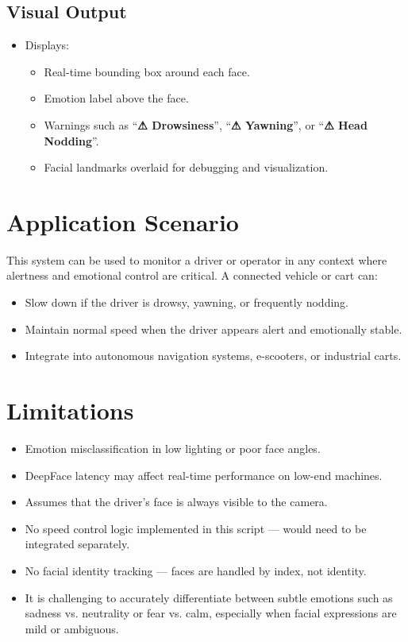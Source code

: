 \documentclass[12pt]{article}
\begin{document}
\subsection{Visual Output}
\begin{itemize}
    \item Displays:
    \begin{itemize}
        \item Real-time bounding box around each face.
        \item Emotion label above the face.
        \item Warnings such as ``\textbf{⚠ Drowsiness}'', ``\textbf{⚠ Yawning}'', or ``\textbf{⚠ Head Nodding}''.
        \item Facial landmarks overlaid for debugging and visualization.
    \end{itemize}
\end{itemize}

\section{Application Scenario}
This system can be used to monitor a driver or operator in any context where alertness and emotional control are critical. A connected vehicle or cart can:
\begin{itemize}
    \item Slow down if the driver is drowsy, yawning, or frequently nodding.
    \item Maintain normal speed when the driver appears alert and emotionally stable.
    \item Integrate into autonomous navigation systems, e-scooters, or industrial carts.
\end{itemize}

\section{Limitations}
\begin{itemize}
    \item Emotion misclassification in low lighting or poor face angles.
    \item DeepFace latency may affect real-time performance on low-end machines.
    \item Assumes that the driver's face is always visible to the camera.
    \item No speed control logic implemented in this script --- would need to be integrated separately.
    \item No facial identity tracking --- faces are handled by index, not identity.
    \item It is challenging to accurately differentiate between subtle emotions such as sadness vs. neutrality or fear vs. calm, especially when facial expressions are mild or ambiguous.
\end{itemize}
\end{document}
